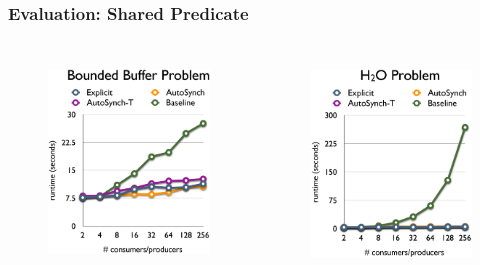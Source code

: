 \documentclass[mathserif,14pt,xcolor=table]{beamer}
\begin{document}
\begin{frame}
    \frametitle{Evaluation: Shared Predicate}
    \begin{columns}[c]
            \begin{figure}[ht!]
                \centering
                \includegraphics[width=56mm]{fig/pc.eps}
                \label{fig:pc_eval}
            \end{figure}
            \begin{figure}[ht!]
                \centering
                \includegraphics[width=56mm]{fig/h2o.eps}
                \label{fig:h2o_eval}
            \end{figure}
    \end{columns}
\end{frame}
\end{document}
